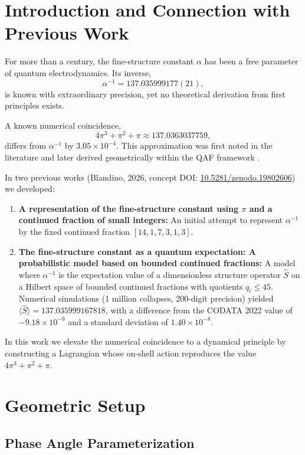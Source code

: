 \documentclass[12pt]{article}
\begin{document}
\section{Introduction and Connection with Previous Work}

For more than a century, the fine-structure constant $\alpha$ has been a free parameter of quantum electrodynamics. Its inverse,
\[
\alpha^{-1} = 137.035999177(21),
\]
is known with extraordinary precision, yet no theoretical derivation from first principles exists.

A known numerical coincidence,
\[
4\pi^3 + \pi^2 + \pi \approx 137.0363037759,
\]
differs from $\alpha^{-1}$ by $3.05\times10^{-4}$. This approximation was first noted in the literature \cite{nature2010} and later derived geometrically within the QAF framework \cite{qaf2026}.

In two previous works (Blandino, 2026, concept DOI: \href{https://doi.org/10.5281/zenodo.19802606}{10.5281/zenodo.19802606}) we developed:

\begin{enumerate}
    \item \textbf{A representation of the fine-structure constant using $\pi$ and a continued fraction of small integers:} An initial attempt to represent $\alpha^{-1}$ by the fixed continued fraction $[14,1,7,3,1,3]$.
    \item \textbf{The fine-structure constant as a quantum expectation: A probabilistic model based on bounded continued fractions:} A model where $\alpha^{-1}$ is the expectation value of a dimensionless structure operator $\hat S$ on a Hilbert space of bounded continued fractions with quotients $q_i \le 45$. Numerical simulations (1 million collapses, 200-digit precision) yielded $\langle \hat S \rangle = 137.035999167818$, with a difference from the CODATA 2022 value of $-9.18\times10^{-9}$ and a standard deviation of $1.40\times10^{-8}$.
\end{enumerate}

In this work we elevate the numerical coincidence to a dynamical principle by constructing a Lagrangian whose on-shell action reproduces the value $4\pi^3 + \pi^2 + \pi$.

\section{Geometric Setup}

\subsection{Phase Angle Parameterization}
\end{document}

